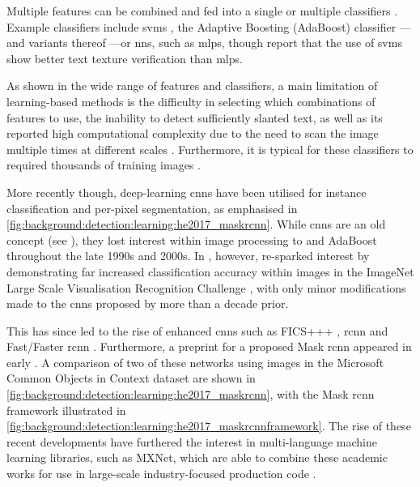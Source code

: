 Multiple features can be combined and fed into a single or multiple classifiers \citep{Pan:2010cj, Hanif:2008un, Hanif:2009tm, Gllavata:2004vq, Ye:2005wu, Wang:2009il, Tu:2003tg}. Example classifiers include \glspl{svm} \citep{Cortes:1995wa,Burges:1998wd,Vapnik:1999vu}, the Adaptive Boosting (AdaBoost) classifier \citep{Freund:1996uc}---and variants thereof \citep{Friedman:2000jg,Hanif:2009tm,Sochman:2005dn}---or \glspl{nn}, such as \glspl{mlp}, though \citet{Chen:2004tja} report that the use of \glspl{svm} show better text texture verification than \glspl{mlp}. 

As shown in the wide range of features and classifiers, a main limitation of learning-based methods is the difficulty in selecting which combinations of features to use, the inability to detect sufficiently slanted text, as well as its reported high computational complexity due to the need to scan the image multiple times at different scales \citep{Li:2012wd, Epshtein:2010tj}. Furthermore, it is typical for these classifiers to required thousands of training images \cite{Chen:2004ux}.

More recently though, deep-learning \glspl{cnn} have been utilised for instance classification and per-pixel segmentation, as emphasised in \cref{fig:background:detection:learning:he2017_maskrcnn}. While \glspl{cnn} are an old concept (see \citet{Lecun:1998hy}), they lost interest within image processing to  and AdaBoost throughout the late 1990s and 2000s. In \citeyear{Krizhevsky:2012wl}, however, \citet{Krizhevsky:2012wl} re-sparked interest by demonstrating far increased classification accuracy within images in the ImageNet Large Scale Visualisation Recognition Challenge \citep{JiaDeng:2009dl}, with only minor modifications made to the \glspl{cnn} proposed by \citeauthor{Lecun:1998hy} more than a decade prior. 

This has since led to the rise of enhanced \glspl{cnn} such as FICS+++ \citep{Li:2016uj}, \gls{rcnn} \citep{Girshick:2014jx} and Fast/Faster \gls{rcnn} \citep{Girshick:2015vr, Ren:2017ug}. Furthermore, a preprint for a proposed Mask \gls{rcnn} \citep{He:2017ud} appeared in early \citeyear{He:2017ud}. A comparison of two of these networks using images in the Microsoft Common Objects in Context \cite{Lin:2014vma} dataset are shown in \cref{fig:background:detection:learning:he2017_maskrcnn}, with the Mask \gls{rcnn} framework illustrated in \cref{fig:background:detection:learning:he2017_maskrcnnframework}. The rise of these recent developments have furthered the interest in multi-language machine learning libraries, such as MXNet, which are able to combine these academic works for use in large-scale industry-focused production code \cite{Chen:2015vh}.

